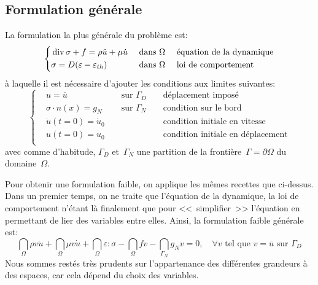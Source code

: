 \subsection{Formulation générale}
La formulation la plus générale du problème est:
\begin{equation}
\left\{
\begin{aligned}
&\operatorname{div}\sigma + f = \rho \ddot{u} + \mu \dot{u} && \text{ dans } \Omega && \text{ équation de la dynamique}\\
&\sigma=D(\varepsilon-\varepsilon_{th}) && \text{ dans } \Omega && \text{ loi de comportement}\\
\end{aligned}\right.
\end{equation}
à laquelle il est nécessaire d'ajouter les conditions aux limites suivantes:
\begin{equation}
\left\{
\begin{aligned}
&u=\overline{u} && \text{ sur } \Gamma_D && \text{ déplacement imposé}\\
&\sigma\cdot n(x)=g_N && \text{ sur } \Gamma_N && \text{ condition sur le bord}\\
&\dot{u}(t=0) = \dot{u}_0&& && \text{ condition initiale en vitesse}\\
&u(t=0) = u_0 && && \text{ condition initiale en déplacement}\\
\end{aligned}
\right.
\end{equation}
avec comme d'habitude, $\Gamma_D$ et~$\Gamma_N$ une partition de la
frontière~$\Gamma=\partial\Omega$ du domaine~$\Omega$.

\medskip
Pour obtenir une formulation faible, on applique les mêmes recettes
que ci-dessus. Dans un premier temps, on ne traite que l'équation de
la dynamique, la loi de comportement n'étant là finalement que pour
<<~simplifier~>> l'équation en permettant de lier des variables entre elles.
Ainsi, la formulation faible générale est:
\begin{equation}
\dint_\Omega \rho v\ddot{u} + \dint_\Omega \mu v\dot{u}
+\dint_\Omega \varepsilon:\sigma - \dint_\Omega fv
-\dint_{\Gamma_N} g_N v =0, \quad \forall v \text{ tel que } v=\overline{u} \text{ sur } \Gamma_D
\end{equation}
Nous sommes restés très prudents sur l'appartenance des différentes grandeurs
à des espaces, car cela dépend du choix des variables.

